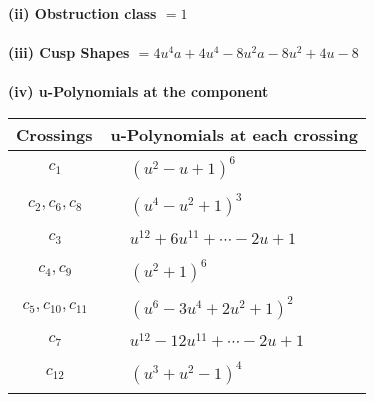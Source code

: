 \documentclass[1p]{elsarticle_modified}
\theoremstyle{definition}
\begin{document}
\flushleft \textbf{(ii) Obstruction class $= 1$}\\~\\
\flushleft \textbf{(iii) Cusp Shapes $= 4 u^4 a+4 u^4-8 u^2 a-8 u^2+4 u-8$}\\~\\
\newpage\renewcommand{\arraystretch}{1}
\flushleft \textbf{(iv) u-Polynomials at the component}\newline \\
\begin{tabular}{m{50pt}|m{274pt}}
Crossings & \hspace{64pt}u-Polynomials at each crossing \\
\hline $$\begin{aligned}c_{1}\end{aligned}$$&$\begin{aligned}
&(u^2- u+1)^6
\end{aligned}$\\
\hline $$\begin{aligned}c_{2},c_{6},c_{8}\end{aligned}$$&$\begin{aligned}
&(u^4- u^2+1)^3
\end{aligned}$\\
\hline $$\begin{aligned}c_{3}\end{aligned}$$&$\begin{aligned}
&u^{12}+6 u^{11}+\cdots-2 u+1
\end{aligned}$\\
\hline $$\begin{aligned}c_{4},c_{9}\end{aligned}$$&$\begin{aligned}
&(u^2+1)^6
\end{aligned}$\\
\hline $$\begin{aligned}c_{5},c_{10},c_{11}\end{aligned}$$&$\begin{aligned}
&(u^6-3 u^4+2 u^2+1)^2
\end{aligned}$\\
\hline $$\begin{aligned}c_{7}\end{aligned}$$&$\begin{aligned}
&u^{12}-12 u^{11}+\cdots-2 u+1
\end{aligned}$\\
\hline $$\begin{aligned}c_{12}\end{aligned}$$&$\begin{aligned}
&(u^3+u^2-1)^4
\end{aligned}$\\
\hline
\end{tabular}\\~\\
\end{document}
